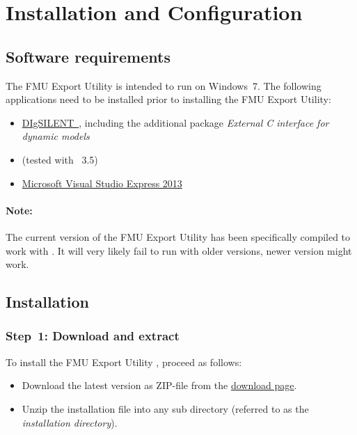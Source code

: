 
\chapter{Installation and Configuration}

\section{Software requirements}

The \fmipp \pf FMU Export Utility is intended to run on Windows~7. The following applications need to be installed prior to installing the \fmipp \pf FMU Export Utility:
\begin{itemize}
  \item \href{http://www.digsilent.com/}{DIgSILENT~\pfversion}, including the additional package \emph{External C interface for dynamic models}
  \item \href{https://www.python.org/}{\python} (tested with \python~3.5)
  \item \href{https://www.visualstudio.com/vs/older-downloads/}{Microsoft Visual Studio Express 2013}
\end{itemize}

\subsubsection*{Note:}
The current version of the \fmipp \pf FMU Export Utility has been specifically compiled to work with \pfversion.
It will very likely fail to run with older versions, newer version might work.


\section{Installation}
\label{sec:install}

\subsection*{Step~1: Download and extract}

To install the \fmipp \pf FMU Export Utility , proceed as follows:
\begin{itemize}
  \item Download the latest version as ZIP-file from the \href{http://sourceforge.net/projects/powerfactory-fmu/files/latest/download}{download page}.
  \item Unzip the installation file into any sub directory (referred to as the \emph{installation directory}).
\end{itemize}

